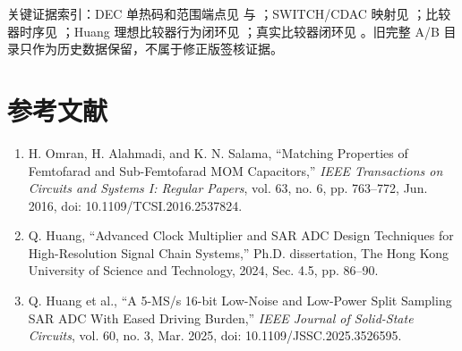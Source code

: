 \documentclass[UTF8,a4paper,11pt]{ctexart}
\begin{document}
关键证据索引：DEC 单热码和范围端点见  与 ；SWITCH/CDAC 映射见 ；比较器时序见 ；Huang 理想比较器行为闭环见 ；真实比较器闭环见 。旧完整 A/B 目录只作为历史数据保留，不属于修正版签核证据。

\section{参考文献}

\begin{enumerate}
  \item H. Omran, H. Alahmadi, and K. N. Salama, ``Matching Properties of Femtofarad and Sub-Femtofarad MOM Capacitors,'' \emph{IEEE Transactions on Circuits and Systems I: Regular Papers}, vol. 63, no. 6, pp. 763--772, Jun. 2016, doi: 10.1109/TCSI.2016.2537824.
  \item Q. Huang, ``Advanced Clock Multiplier and SAR ADC Design Techniques for High-Resolution Signal Chain Systems,'' Ph.D. dissertation, The Hong Kong University of Science and Technology, 2024, Sec. 4.5, pp. 86--90.
  \item Q. Huang et al., ``A 5-MS/s 16-bit Low-Noise and Low-Power Split Sampling SAR ADC With Eased Driving Burden,'' \emph{IEEE Journal of Solid-State Circuits}, vol. 60, no. 3, Mar. 2025, doi: 10.1109/JSSC.2025.3526595.
\end{enumerate}
\end{document}
